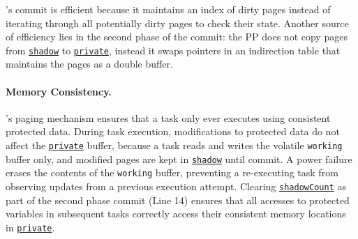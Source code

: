\sys's commit is efficient because it maintains an index of dirty pages instead of iterating through all potentially dirty pages to check their state.
Another source of efficiency lies in the second phase of the commit:
the PP does not copy pages from \texttt{\underline{shadow}} to \texttt{\underline{private}}, instead it swaps pointers in an indirection table that maintains the pages as a double buffer.

\paragraph{Memory Consistency.}
\sys's paging mechanism ensures that a task only ever executes using consistent protected data. During task execution, modifications to protected data do not affect the \texttt{\underline{private}} buffer, because a task reads and writes the volatile \texttt{working} buffer only, and modified pages are kept in \texttt{\underline{shadow}} until commit. A power failure erases the contents of the \texttt{working} buffer, preventing a re-executing task from observing updates from a previous execution attempt. Clearing \texttt{\underline{shadowCount}} as part of the second phase commit (Line 14) ensures that all accesses to protected variables in subsequent tasks correctly access their consistent memory locations in \texttt{\underline{private}}.

